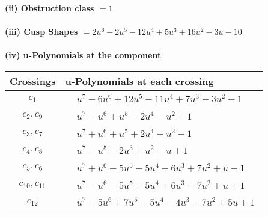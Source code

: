\documentclass[1p]{elsarticle_modified}
\theoremstyle{definition}
\begin{document}
\flushleft \textbf{(ii) Obstruction class $= 1$}\\~\\
\flushleft \textbf{(iii) Cusp Shapes $= 2 u^6-2 u^5-12 u^4+5 u^3+16 u^2-3 u-10$}\\~\\
\newpage\renewcommand{\arraystretch}{1}
\flushleft \textbf{(iv) u-Polynomials at the component}\newline \\
\begin{tabular}{m{50pt}|m{274pt}}
Crossings & \hspace{64pt}u-Polynomials at each crossing \\
\hline $$\begin{aligned}c_{1}\end{aligned}$$&$\begin{aligned}
&u^7-6 u^6+12 u^5-11 u^4+7 u^3-3 u^2-1
\end{aligned}$\\
\hline $$\begin{aligned}c_{2},c_{9}\end{aligned}$$&$\begin{aligned}
&u^7- u^6+u^5-2 u^4- u^2+1
\end{aligned}$\\
\hline $$\begin{aligned}c_{3},c_{7}\end{aligned}$$&$\begin{aligned}
&u^7+u^6+u^5+2 u^4+u^2-1
\end{aligned}$\\
\hline $$\begin{aligned}c_{4},c_{8}\end{aligned}$$&$\begin{aligned}
&u^7- u^5-2 u^3+u^2- u+1
\end{aligned}$\\
\hline $$\begin{aligned}c_{5},c_{6}\end{aligned}$$&$\begin{aligned}
&u^7+u^6-5 u^5-5 u^4+6 u^3+7 u^2+u-1
\end{aligned}$\\
\hline $$\begin{aligned}c_{10},c_{11}\end{aligned}$$&$\begin{aligned}
&u^7- u^6-5 u^5+5 u^4+6 u^3-7 u^2+u+1
\end{aligned}$\\
\hline $$\begin{aligned}c_{12}\end{aligned}$$&$\begin{aligned}
&u^7-5 u^6+7 u^5-5 u^4-4 u^3-7 u^2+5 u+1
\end{aligned}$\\
\hline
\end{tabular}\\~\\
\end{document}
